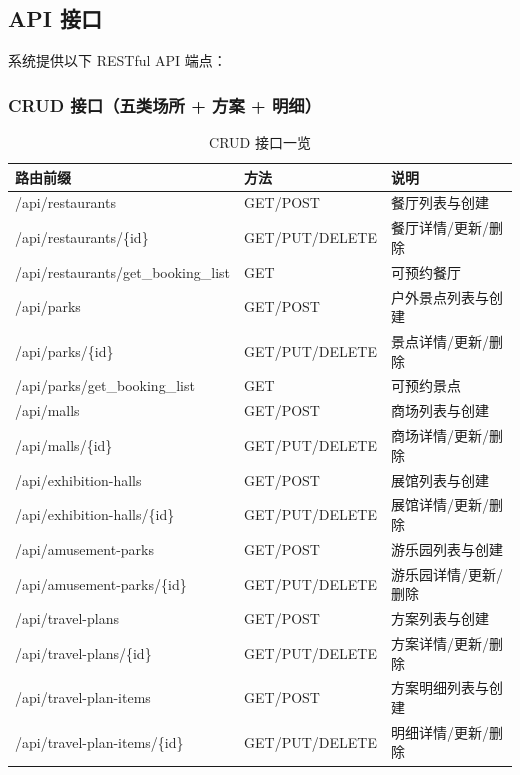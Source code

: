 \documentclass[12pt,a4paper]{ctexart}
\begin{document}
\subsection{API 接口}

系统提供以下 RESTful API 端点：

\subsubsection{CRUD 接口（五类场所 + 方案 + 明细）}

\begin{table}[ht]
\centering
\footnotesize
\begin{tabular}{llp{4.5cm}}
\toprule
\textbf{路由前缀} & \textbf{方法} & \textbf{说明} \\
\midrule
/api/restaurants    & GET/POST & 餐厅列表与创建 \\
/api/restaurants/\{id\} & GET/PUT/DELETE & 餐厅详情/更新/删除 \\
/api/restaurants/get\_booking\_list & GET & 可预约餐厅 \\
/api/parks          & GET/POST & 户外景点列表与创建 \\
/api/parks/\{id\}   & GET/PUT/DELETE & 景点详情/更新/删除 \\
/api/parks/get\_booking\_list & GET & 可预约景点 \\
/api/malls          & GET/POST & 商场列表与创建 \\
/api/malls/\{id\}   & GET/PUT/DELETE & 商场详情/更新/删除 \\
/api/exhibition-halls & GET/POST & 展馆列表与创建 \\
/api/exhibition-halls/\{id\} & GET/PUT/DELETE & 展馆详情/更新/删除 \\
/api/amusement-parks & GET/POST & 游乐园列表与创建 \\
/api/amusement-parks/\{id\} & GET/PUT/DELETE & 游乐园详情/更新/删除 \\
/api/travel-plans   & GET/POST & 方案列表与创建 \\
/api/travel-plans/\{id\} & GET/PUT/DELETE & 方案详情/更新/删除 \\
/api/travel-plan-items & GET/POST & 方案明细列表与创建 \\
/api/travel-plan-items/\{id\} & GET/PUT/DELETE & 明细详情/更新/删除 \\
\bottomrule
\end{tabular}
\caption{CRUD 接口一览}
\label{tab:crud-apis}
\end{table}
\end{document}
